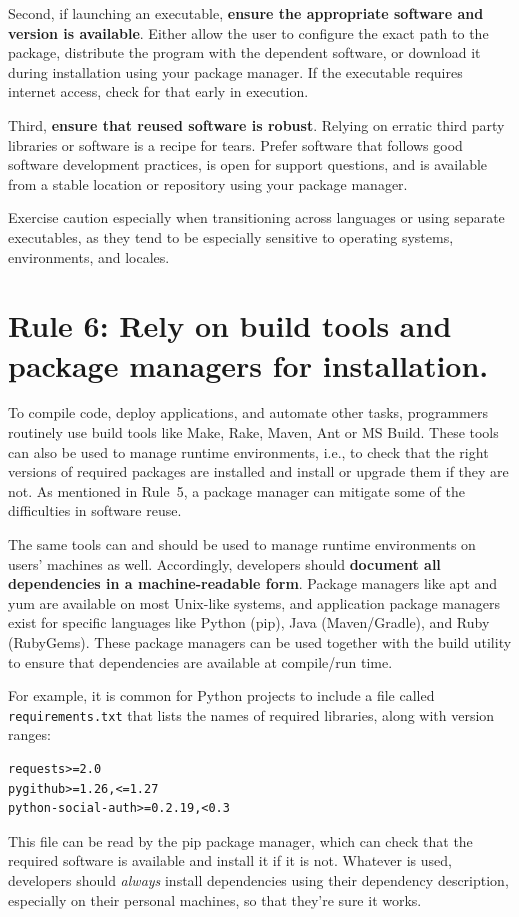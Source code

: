 \documentclass[10pt,letterpaper]{article}
\newcommand{\rulemajor}[1]{\section{#1}}
\newcommand{\ruleminor}[1]{\textbf{#1}}
\begin{document}
Second, if launching an executable, \ruleminor{ensure the appropriate
software and version is available}.  Either allow the user to
configure the exact path to the package, distribute the program with
the dependent software, or download it during installation using your
package manager. If the executable requires internet access, check for
that early in execution.

Third, \ruleminor{ensure that reused software is robust}. Relying on
erratic third party libraries or software is a recipe for
tears. Prefer software that follows good software development
practices, is open for support questions, and is available from a
stable location or repository using your package manager.

Exercise caution especially when transitioning across languages or
using separate executables, as they tend to be especially sensitive to
operating systems, environments, and locales.

\rulemajor{Rule 6: Rely on build tools and package managers for installation.}

To compile code, deploy applications, and automate other tasks,
programmers routinely use build tools like Make, Rake, Maven, Ant or
MS Build.  These tools can also be used to manage runtime
environments, i.e., to check that the right versions of required
packages are installed and install or upgrade them if they are not.
As mentioned in Rule~5, a package manager can mitigate some of the
difficulties in software reuse.

The same tools can and should be used to manage runtime environments
on users' machines as well.  Accordingly, developers should
\ruleminor{document all dependencies in a machine-readable form}.
Package managers like apt and yum are available on most Unix-like
systems, and application package managers exist for specific languages
like Python (pip), Java (Maven/Gradle), and Ruby (RubyGems). These
package managers can be used together with the build utility to ensure
that dependencies are available at compile/run time.

For example, it is common for Python projects to include a file called
\texttt{requirements.txt} that lists the names of required libraries,
along with version ranges:

\begin{verbatim}
requests>=2.0
pygithub>=1.26,<=1.27
python-social-auth>=0.2.19,<0.3
\end{verbatim}

This file can be read by the pip package manager, which can check that
the required software is available and install it if it is not.
Whatever is used, developers should \emph{always} install dependencies
using their dependency description, especially on their personal
machines, so that they're sure it works.
\end{document}
